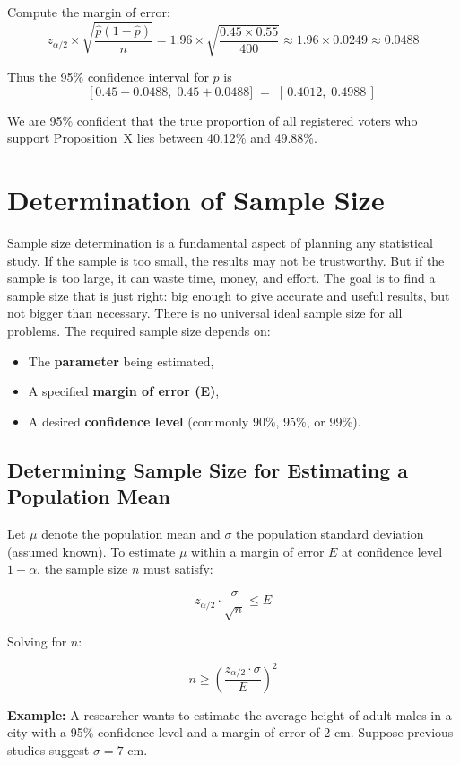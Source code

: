 \documentclass[twoside]{book}
\begin{document}
Compute the margin of error:
\[
z_{\alpha/2} \times \sqrt{\frac{\hat{p}(1 - \hat{p})}{n}}
= 1.96 \times \sqrt{\frac{0.45 \times 0.55}{400}}
\approx 1.96 \times 0.0249
\approx 0.0488
\]

Thus the 95\% confidence interval for $p$ is
\[
\bigl[\,0.45 - 0.0488,\;0.45 + 0.0488\bigr]
\;=\;
[\,0.4012,\;0.4988\,]
\]

We are 95\% confident that the true proportion of all registered voters who support Proposition~X lies between 40.12\% and 49.88\%.

\section{Determination of Sample Size}

Sample size determination is a fundamental aspect of planning any statistical study. If the sample is too small, the results may not be trustworthy. But if the sample is too large, it can waste time, money, and effort. The goal is to find a sample size that is just right: big enough to give accurate and useful results, but not bigger than necessary. There is no universal ideal sample size for all problems. The required sample size depends on:
\begin{itemize}
	\item The \textbf{parameter} being estimated,
	\item A specified \textbf{margin of error (E)},
	\item A desired \textbf{confidence level} (commonly 90\%, 95\%, or 99\%).
\end{itemize}

\subsection{Determining Sample Size for Estimating a Population Mean}

Let \(\mu\) denote the population mean and \(\sigma\) the population standard deviation (assumed known). To estimate \(\mu\) within a margin of error \(E\) at confidence level \(1 - \alpha\), the sample size \(n\) must satisfy:

\[
z_{\alpha/2} \cdot \frac{\sigma}{\sqrt{n}} \leq E
\]

Solving for \(n\):

\[
n \geq \left( \frac{z_{\alpha/2} \cdot \sigma}{E} \right)^2
\]

\textbf{Example:} A researcher wants to estimate the average height of adult males in a city with a 95\% confidence level and a margin of error of 2 cm. Suppose previous studies suggest \(\sigma = 7\) cm.
\end{document}

